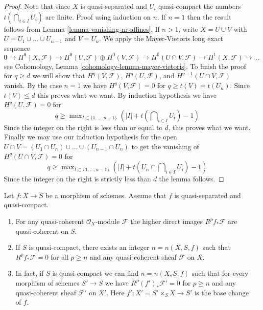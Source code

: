 \begin{proof}
Note that since $X$ is quasi-separated and $U_i$ quasi-compact the numbers
$t(\bigcap_{i \in I} U_i)$ are finite. Proof using induction on $n$.
If $n = 1$ then the result follows from Lemma \ref{lemma-vanishing-nr-affines}.
If $n > 1$, write $X = U \cup V$ with $U = U_1 \cup \ldots \cup U_{n - 1}$
and $V = U_n$. We apply the Mayer-Vietoris long exact sequence
$$
0 \to
H^0(X, \mathcal{F}) \to
H^0(U, \mathcal{F}) \oplus H^0(V, \mathcal{F}) \to
H^0(U \cap V, \mathcal{F}) \to
H^1(X, \mathcal{F}) \to \ldots
$$
see Cohomology, Lemma \ref{cohomology-lemma-mayer-vietoris}.
To finish the proof for $q \geq d$ we will show that
$H^q(V, \mathcal{F})$, $H^q(U, \mathcal{F})$, and
$H^{q - 1}(U \cap V, \mathcal{F})$ vanish.
By the case $n = 1$ we have $H^q(V, \mathcal{F}) = 0$ for
$q \geq t(V) = t(U_n)$. Since $t(V) \leq d$ this proves what we want.
By induction hypothesis we have $H^q(U, \mathcal{F}) = 0$ for
$$
q \geq \max\nolimits_{I \subset \{1, \ldots, n - 1\}}
\left(|I| + t(\bigcap\nolimits_{i \in I} U_i) - 1\right)
$$
Since the integer on the right is less than or equal to $d$, this
proves what we want. Finally we may use our induction hypothesis for the open
$U \cap V = (U_1 \cap U_n) \cup \ldots \cup (U_{n - 1} \cap U_n)$ to get
the vanishing of $H^q(U \cap V, \mathcal{F}) = 0$ for
$$
q \geq \max\nolimits_{I \subset \{1, \ldots, n - 1\}}
\left(|I| + t(U_n \cap \bigcap\nolimits_{i \in I} U_i) - 1\right)
$$
Since the integer on the right is strictly less than $d$
the lemma follows.
\end{proof}

\begin{lemma}
\label{lemma-quasi-coherence-higher-direct-images}
Let $f : X \to S$ be a morphism of schemes.
Assume that $f$ is quasi-separated and quasi-compact.
\begin{enumerate}
\item For any quasi-coherent $\mathcal{O}_X$-module $\mathcal{F}$ the
higher direct images $R^pf_*\mathcal{F}$ are quasi-coherent on $S$.
\item If $S$ is quasi-compact, there exists an integer $n = n(X, S, f)$
such that $R^pf_*\mathcal{F} = 0$ for all $p \geq n$ and any
quasi-coherent sheaf $\mathcal{F}$ on $X$.
\item In fact, if $S$ is quasi-compact we can find $n = n(X, S, f)$
such that for every
morphism of schemes $S' \to S$ we have $R^p(f')_*\mathcal{F}' = 0$
for $p \geq n$ and any quasi-coherent sheaf $\mathcal{F}'$
on $X'$. Here $f' : X' = S' \times_S X \to S'$ is the base change of $f$.
\end{enumerate}
\end{lemma}

